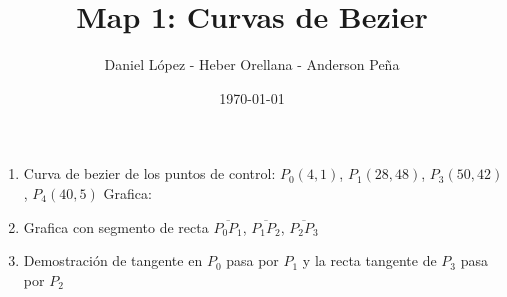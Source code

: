 \documentclass[11pt]{article}
\begin{document}
\author{Daniel López - Heber Orellana - Anderson Peña} \date{\today}
\title{Map 1: Curvas de Bezier}
\maketitle

\medskip

\begin{enumerate}

\item
Curva de bezier de los puntos de control: $P_0(4,1)$, $P_1(28,48)$, $P_3(50,42)$, $P_4(40,5)$
Grafica:

\item
Grafica con segmento de recta $\overline{P_0 P_1}$, $\overline{P_1 P_2}$, $\overline{P_2 P_3}$

\item
Demostración de tangente en $P_0$ pasa por $P_1$ y la recta tangente de  $P_3$ pasa por $P_2$


\end{enumerate}
\end{document}
